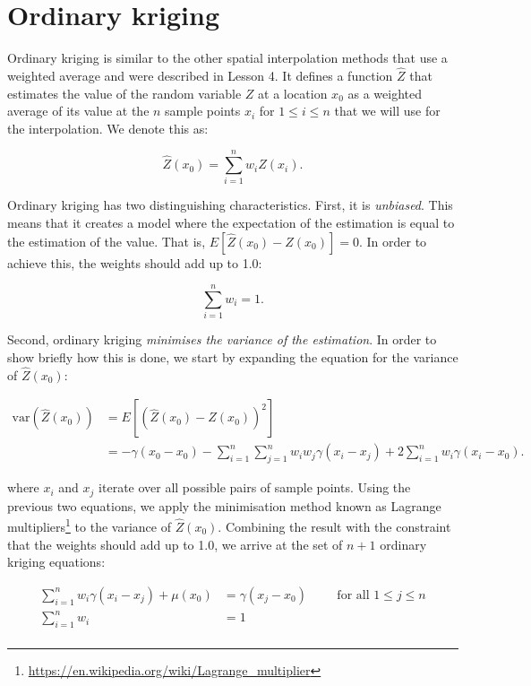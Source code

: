 \section{Ordinary kriging}

Ordinary kriging is similar to the other spatial interpolation methods that use a weighted average and were described in Lesson 4.
It defines a function \(\hat{Z}\) that estimates the value of the random variable \(Z\) at a location \(x_0\) as a weighted average of its value at the \(n\) sample points \(x_i\) for \(1 \leq i \leq n\) that we will use for the interpolation.
We denote this as:

\begin{equation}
\hat{Z}(x_0) = \sum_{i=1}^n w_i Z(x_i).
\end{equation}

Ordinary kriging has two distinguishing characteristics. First, it is \emph{unbiased}.
This means that it creates a model where the expectation of the estimation is equal to the estimation of the value.
That is, \(E\left[ \hat{Z}(x_0) - Z(x_0) \right] = 0\).
In order to achieve this, the weights should add up to 1.0:

\begin{equation}
\sum_{i=1}^n w_i = 1.
\end{equation}

Second, ordinary kriging \emph{minimises the variance of the estimation}. In order to show briefly how this is done, we start by expanding the equation for the variance of \(\hat{Z}\left(x_0\right)\):

\begin{align}
\mathrm{var}\left(\hat{Z}\left(x_0\right)\right) &= E\left[\left( \hat{Z}(x_0) - Z(x_0) \right)^2\right] \nonumber \\
&= -\gamma(x_0 - x_0) - \sum_{i=1}^n\sum_{j=1}^n w_i w_j \gamma(x_i-x_j) + 2 \sum_{i=1}^n w_i \gamma(x_i-x_0).
\end{align}

where \(x_i\) and \(x_j\) iterate over all possible pairs of sample points.
Using the previous two equations, we apply the minimisation method known as Lagrange multipliers\footnote{\url{https://en.wikipedia.org/wiki/Lagrange_multiplier}} to the variance of \(\hat{Z}\left(x_0\right)\).
Combining the result with the constraint that the weights should add up to 1.0, we arrive at the set of \(n+1\) ordinary kriging equations:

\begin{align}
\sum_{i=1}^n w_i \gamma(x_i-x_j) + \mu(x_0) &= \gamma(x_j-x_0) \hspace{1cm} \text{for all } 1 \leq j \leq n \\
\sum_{i=1}^n w_i &= 1 \\
\end{align}

